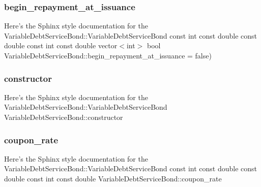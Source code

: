 \subsubsection{\texorpdfstring{begin\+\_\+repayment\+\_\+at\+\_\+issuance}{begin\_repayment\_at\_issuance}}
{\footnotesize\ttfamily Here’s the Sphinx style documentation for the Variable\+Debt\+Service\+Bond\+::\+Variable\+Debt\+Service\+Bond const int const double const double const int const double vector$<$int$>$ bool Variable\+Debt\+Service\+Bond\+::begin\+\_\+repayment\+\_\+at\+\_\+issuance = false)}

\mbox{\label{classVariableDebtServiceBond_a9369eb5b081c45a8608630b3eacae979}} 
\subsubsection{\texorpdfstring{constructor}{constructor}}
{\footnotesize\ttfamily Here’s the Sphinx style documentation for the Variable\+Debt\+Service\+Bond\+::\+Variable\+Debt\+Service\+Bond Variable\+Debt\+Service\+Bond\+::constructor}

\mbox{\label{classVariableDebtServiceBond_a4062feaf0e15546bbcf575aa8ec372e0}} 
\subsubsection{\texorpdfstring{coupon\+\_\+rate}{coupon\_rate}}
{\footnotesize\ttfamily Here’s the Sphinx style documentation for the Variable\+Debt\+Service\+Bond\+::\+Variable\+Debt\+Service\+Bond const int const double const double const int const double Variable\+Debt\+Service\+Bond\+::coupon\+\_\+rate}

\mbox{\label{classVariableDebtServiceBond_a23f451bb14e4898aaa585fbeae9667f9}} 
